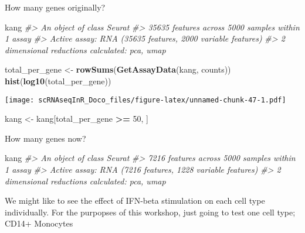 \documentclass[
]{book}
\newenvironment{Shaded}{\begin{snugshade}}{\end{snugshade}}
\newcommand{\CommentTok}[1]{\textcolor[rgb]{0.56,0.35,0.01}{\textit{#1}}}
\newcommand{\DecValTok}[1]{\textcolor[rgb]{0.00,0.00,0.81}{#1}}
\newcommand{\FunctionTok}[1]{\textcolor[rgb]{0.13,0.29,0.53}{\textbf{#1}}}
\newcommand{\NormalTok}[1]{#1}
\newcommand{\OtherTok}[1]{\textcolor[rgb]{0.56,0.35,0.01}{#1}}
\newcommand{\SpecialCharTok}[1]{\textcolor[rgb]{0.81,0.36,0.00}{\textbf{#1}}}
\newcommand{\StringTok}[1]{\textcolor[rgb]{0.31,0.60,0.02}{#1}}
\begin{document}
How many genes originally?

\begin{Shaded}
\begin{Highlighting}[]
\NormalTok{kang}
\CommentTok{\#\textgreater{} An object of class Seurat }
\CommentTok{\#\textgreater{} 35635 features across 5000 samples within 1 assay }
\CommentTok{\#\textgreater{} Active assay: RNA (35635 features, 2000 variable features)}
\CommentTok{\#\textgreater{}  2 dimensional reductions calculated: pca, umap}
\end{Highlighting}
\end{Shaded}

\begin{Shaded}
\begin{Highlighting}[]
\NormalTok{total\_per\_gene }\OtherTok{\textless{}{-}} \FunctionTok{rowSums}\NormalTok{(}\FunctionTok{GetAssayData}\NormalTok{(kang, }\StringTok{\textquotesingle{}counts\textquotesingle{}}\NormalTok{))}
\FunctionTok{hist}\NormalTok{(}\FunctionTok{log10}\NormalTok{(total\_per\_gene))}
\end{Highlighting}
\end{Shaded}

\texttt{[image: scRNAseqInR\_Doco\_files/figure-latex/unnamed-chunk-47-1.pdf]}

\begin{Shaded}
\begin{Highlighting}[]
\NormalTok{kang }\OtherTok{\textless{}{-}}\NormalTok{ kang[total\_per\_gene }\SpecialCharTok{\textgreater{}=} \DecValTok{50}\NormalTok{, ] }
\end{Highlighting}
\end{Shaded}

How many genes now?

\begin{Shaded}
\begin{Highlighting}[]
\NormalTok{kang}
\CommentTok{\#\textgreater{} An object of class Seurat }
\CommentTok{\#\textgreater{} 7216 features across 5000 samples within 1 assay }
\CommentTok{\#\textgreater{} Active assay: RNA (7216 features, 1228 variable features)}
\CommentTok{\#\textgreater{}  2 dimensional reductions calculated: pca, umap}
\end{Highlighting}
\end{Shaded}

We might like to see the effect of IFN-beta stimulation on each cell type individually. For the purpopses of this workshop, just going to test one cell type; CD14+ Monocytes
\end{document}
